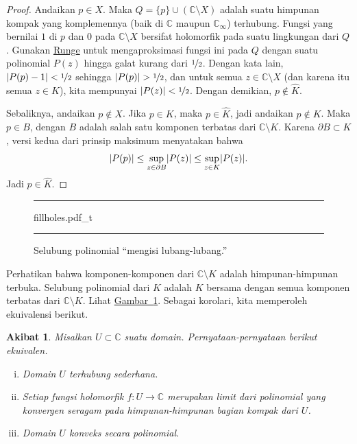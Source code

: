 \documentclass[12pt,openany]{book}
\newcommand{\avoidbreak}{\postdisplaypenalty=100}
\newcommand{\sabs}[1]{\lvert {#1} \rvert}
\newcommand{\abs}[1]{\left\lvert {#1} \right\rvert}
\newcommand{\C}{{\mathbb{C}}}
\newcommand{\myquote}[1]{``#1''}
\theoremstyle{plain}
\newtheorem{cor}[thm]{Akibat}
\theoremstyle{remark}
\theoremstyle{definition}
\newenvironment{myfig}{%
\begin{figure}[h!t]
\noindent\rule{\textwidth}{0.5pt}\vspace{12pt}\par\centering}%
{\par\noindent\rule{\textwidth}{0.5pt}
\end{figure}}
\theoremstyle{exercise}
\theoremstyle{example}
\newcommand{\figureref}[1]{\hyperref[#1]{Gambar~\ref*{#1}}}
\begin{document}
\begin{proof}
Andaikan $p \in X$.  Maka $Q=\{ p \} \cup ( \C \setminus X )$ adalah suatu himpunan kompak
yang
komplemennya (baik di $\C$ maupun $\C_\infty$) terhubung.
Fungsi yang bernilai $1$ di $p$ dan $0$ pada $\C \setminus X$
bersifat holomorfik pada suatu lingkungan dari $Q$.
Gunakan \hyperref[thm:rungecpt]{Runge} untuk mengaproksimasi fungsi ini pada $Q$
dengan suatu polinomial $P(z)$ hingga galat kurang dari $\nicefrac{1}{2}$.  Dengan kata lain,
$\abs{P(p)-1} < \nicefrac{1}{2}$ sehingga 
$\abs{P(p)} > \nicefrac{1}{2}$, dan untuk semua $z \in \C \setminus X$ (dan
karena itu semua $z \in K$),
kita mempunyai 
$\abs{P(z)} < \nicefrac{1}{2}$.  Dengan demikian, $p \notin \widehat{K}$.

Sebaliknya, andaikan $p \notin X$.
Jika $p \in K$, maka $p \in \widehat{K}$, jadi andaikan $p \notin K$.
Maka $p \in B$, dengan $B$
adalah salah satu komponen terbatas dari $\C \setminus K$.  Karena
$\partial B \subset K$, versi kedua dari prinsip
maksimum menyatakan bahwa 
\begin{equation*}
\sabs{P(p)} \leq
\sup_{z \in \partial B} \sabs{P(z)}
\leq
\sup_{z \in K} \sabs{P(z)}.
\avoidbreak
\end{equation*}
Jadi $p \in \widehat{K}$.
\end{proof}

\begin{myfig}
{fillholes.pdf_t}
\caption{Selubung polinomial \myquote{mengisi lubang-lubang.}\label{fig:fillholes}}
\end{myfig}

Perhatikan bahwa komponen-komponen dari $\C \setminus K$ adalah himpunan-himpunan terbuka.
Selubung polinomial dari $K$ adalah $K$ bersama dengan semua komponen terbatas
dari $\C \setminus K$.  Lihat \figureref{fig:fillholes}.
Sebagai korolari, kita memperoleh ekuivalensi berikut.

\begin{cor}
Misalkan $U \subset \C$ suatu domain.  Pernyataan-pernyataan berikut ekuivalen.
\begin{enumerate}[(i)]
\item\label{cor:polyhull:i}
Domain $U$ terhubung sederhana.
\item\label{cor:polyhull:ii}
Setiap fungsi holomorfik $f \colon U \to \C$ merupakan limit dari polinomial
yang konvergen seragam pada himpunan-himpunan bagian kompak dari $U$.
\item\label{cor:polyhull:iii}
Domain $U$ konveks secara polinomial.
\end{enumerate}
\end{cor}
\end{document}

